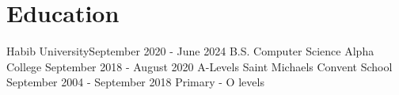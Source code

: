 \section{Education}
  \resumeSubHeadingListStart
  
    \resumeSubheading
      {Habib University}{September 2020 - June 2024}
      {B.S. Computer Science}{}
      \resumeSubheading
      {Alpha College \footnotesize{}}{September 2018 - August 2020 }
      {A-Levels}{}    
    \resumeSubheading
      {Saint Michaels Convent School \footnotesize{}}{September 2004 - September 2018 }
      {Primary - O levels}{}    

      \resumeSubHeadingListEnd
